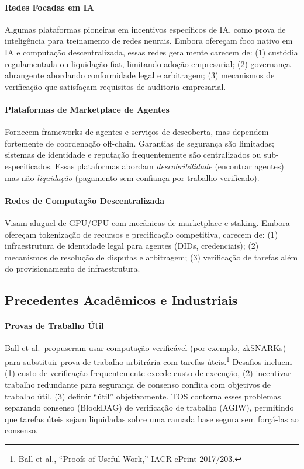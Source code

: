 \documentclass[11pt]{article}
\begin{document}
\paragraph{Redes Focadas em IA} Algumas plataformas pioneiras em incentivos específicos de IA, como prova de inteligência para treinamento de redes neurais. Embora ofereçam foco nativo em IA e computação descentralizada, essas redes geralmente carecem de: (1) custódia regulamentada ou liquidação fiat, limitando adoção empresarial; (2) governança abrangente abordando conformidade legal e arbitragem; (3) mecanismos de verificação que satisfaçam requisitos de auditoria empresarial.

\paragraph{Plataformas de Marketplace de Agentes} Fornecem frameworks de agentes e serviços de descoberta, mas dependem fortemente de coordenação off-chain. Garantias de segurança são limitadas; sistemas de identidade e reputação frequentemente são centralizados ou sub-especificados. Essas plataformas abordam \emph{descobribilidade} (encontrar agentes) mas não \emph{liquidação} (pagamento sem confiança por trabalho verificado).

\paragraph{Redes de Computação Descentralizada} Visam aluguel de GPU/CPU com mecânicas de marketplace e staking. Embora ofereçam tokenização de recursos e precificação competitiva, carecem de: (1) infraestrutura de identidade legal para agentes (DIDs, credenciais); (2) mecanismos de resolução de disputas e arbitragem; (3) verificação de tarefas além do provisionamento de infraestrutura.

\subsection{Precedentes Acadêmicos e Industriais}
\paragraph{Provas de Trabalho Útil} Ball et al.\ propuseram usar computação verificável (por exemplo, zkSNARKs) para substituir prova de trabalho arbitrária com tarefas úteis.\footnote{Ball et al., ``Proofs of Useful Work,'' IACR ePrint 2017/203.} Desafios incluem (1) custo de verificação frequentemente excede custo de execução, (2) incentivar trabalho redundante para segurança de consenso conflita com objetivos de trabalho útil, (3) definir ``útil'' objetivamente. TOS contorna esses problemas separando consenso (BlockDAG) de verificação de trabalho (AGIW), permitindo que tarefas úteis sejam liquidadas sobre uma camada base segura sem forçá-las ao consenso.
\end{document}
